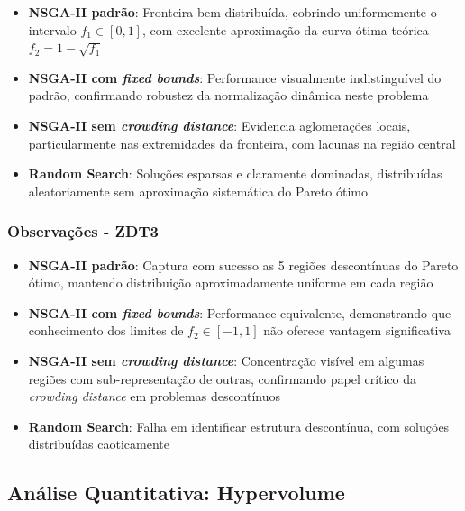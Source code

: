 \begin{itemize}
    \item \textbf{NSGA-II padrão}: Fronteira bem distribuída, cobrindo uniformemente o intervalo $f_1 \in [0, 1]$, com excelente aproximação da curva ótima teórica $f_2 = 1 - \sqrt{f_1}$
    
    \item \textbf{NSGA-II com \textit{fixed bounds}}: Performance visualmente indistinguível do padrão, confirmando robustez da normalização dinâmica neste problema
    
    \item \textbf{NSGA-II sem \textit{crowding distance}}: Evidencia aglomerações locais, particularmente nas extremidades da fronteira, com lacunas na região central
    
    \item \textbf{Random Search}: Soluções esparsas e claramente dominadas, distribuídas aleatoriamente sem aproximação sistemática do Pareto ótimo
\end{itemize}

\subsubsection{Observações - ZDT3}

\begin{itemize}
    \item \textbf{NSGA-II padrão}: Captura com sucesso as 5 regiões descontínuas do Pareto ótimo, mantendo distribuição aproximadamente uniforme em cada região
    
    \item \textbf{NSGA-II com \textit{fixed bounds}}: Performance equivalente, demonstrando que conhecimento dos limites de $f_2 \in [-1, 1]$ não oferece vantagem significativa
    
    \item \textbf{NSGA-II sem \textit{crowding distance}}: Concentração visível em algumas regiões com sub-representação de outras, confirmando papel crítico da \textit{crowding distance} em problemas descontínuos
    
    \item \textbf{Random Search}: Falha em identificar estrutura descontínua, com soluções distribuídas caoticamente
\end{itemize}

\subsection{Análise Quantitativa: Hypervolume}

